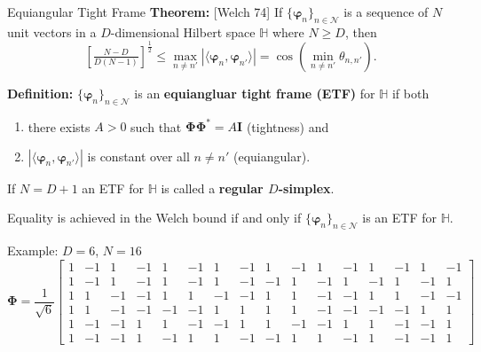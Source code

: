 \documentclass[12pt]{beamer}
\newcommand{\bbH}{\mathbb{H}}
\newcommand{\bfI}{\mathbf{I}}
\newcommand{\bfphi}{\boldsymbol{\varphi}}
\newcommand{\bfPhi}{\boldsymbol{\Phi}}
\newcommand{\calN}{\mathcal{N}}
\newcommand{\abs}[1]{|{#1}|}
\newcommand{\ip}[2]{\langle{#1},{#2}\rangle}
\begin{document}
\begin{frame}{Equiangular Tight Frame}
\textbf{Theorem:} [Welch 74]
If $\{\bfphi_n\}_{n\in\calN}$ is a sequence of $N$ unit vectors in a $D$-dimensional Hilbert space $\bbH$ where $N\geq D$, then
\begin{equation*}
    \left[\tfrac{N-D}{D(N-1)}\right]^{\tfrac{1}{2}}\leq\max_{n\not=n'}\abs{\ip{\bfphi_n}{\bfphi_{n'}}}=\cos(\min_{n\not=n'}\theta_{n,n'}).
\end{equation*}

\vfill

\textbf{Definition:} $\{\bfphi_n\}_{n\in\calN}$ is an \textbf{equiangluar tight frame (ETF)} for $\bbH$ if both
\begin{enumerate}
    \item there exists $A>0$ such that $\bfPhi\bfPhi^*=A\bfI$ (tightness) and
    \item $\abs{\ip{\bfphi_n}{\bfphi_{n'}}}$ is constant over all $n\not=n'$ (equiangular).
\end{enumerate}
If $N=D+1$ an ETF for $\bbH$ is called a \textbf{regular $D$-simplex}.

\vfill

Equality is achieved in the Welch bound if and only if $\{\bfphi_n\}_{n\in\calN}$ is an ETF for $\bbH$.

\end{frame}

\begin{frame}{Example: $D=6$, $N=16$}
\footnotesize{
\begin{equation*}
\bfPhi=\frac1{\sqrt{6}}\left[\begin{array}{rrrrrrrrrrrrrrrr}
1&-1& 1&-1& 1&-1& 1&-1& 1&-1& 1&-1& 1&-1& 1&-1\\
1&-1& 1&-1& 1&-1& 1&-1&-1& 1&-1& 1&-1& 1&-1& 1\\
1& 1&-1&-1& 1& 1&-1&-1& 1& 1&-1&-1& 1& 1&-1&-1\\
1& 1&-1&-1&-1&-1& 1& 1& 1& 1&-1&-1&-1&-1& 1& 1\\
1&-1&-1& 1& 1&-1&-1& 1& 1&-1&-1& 1& 1&-1&-1& 1\\
1&-1&-1& 1&-1& 1& 1&-1&-1& 1& 1&-1& 1&-1&-1& 1
\end{array}\right]
\end{equation*}
}
\end{frame}
\end{document}
